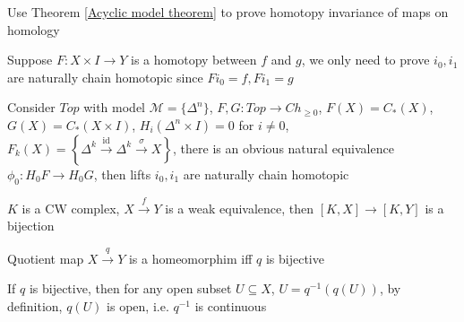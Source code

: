 \documentclass[main]{subfiles}
\begin{document}
\begin{exercise}
Use Theorem \ref{Acyclic model theorem} to prove homotopy invariance of maps on homology
\end{exercise}

\begin{solution}
Suppose $F:X\times I\to Y$ is a homotopy between $f$ and $g$, we only need to prove $i_0,i_1$ are naturally chain homotopic since $Fi_0=f,Fi_1=g$
\begin{center}
\end{center}
Consider $Top$ with model $\mathcal M=\{\Delta^n\}$, $F,G:Top\to Ch_{\geq0}$, $F(X)=C_*(X)$, $G(X)=C_*(X\times I)$, $H_i(\Delta^n\times I)=0$ for $i\neq0$, $F_k(X)=\left\{\Delta^k\xrightarrow{\mathrm{id}}\Delta^k\xrightarrow{\sigma}X\right\}$, there is an obvious natural equivalence $\phi_0:H_0F\to H_0G$, then lifts $i_0,i_1$ are naturally chain homotopic
\end{solution}

\begin{exercise}
$K$ is a CW complex, $X\xrightarrow{f}Y$ is a weak equivalence, then $[K,X]\to[K,Y]$ is a bijection
\end{exercise}

\begin{exercise}
Quotient map $X\xrightarrow{q}Y$ is a homeomorphim iff $q$ is bijective
\end{exercise}

\begin{solution}
If $q$ is bijective, then for any open subset $U\subseteq X$, $U=q^{-1}(q(U))$, by definition, $q(U)$ is open, i.e. $q^{-1}$ is continuous
\end{solution}
\end{document}
